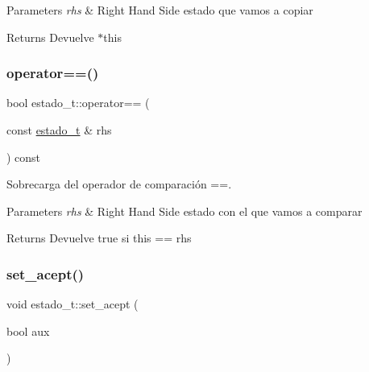 \begin{DoxyParams}{Parameters}
{\em rhs} & Right Hand Side estado que vamos a copiar \\
\hline
\end{DoxyParams}
\begin{DoxyReturn}{Returns}
Devuelve $\ast$this 
\end{DoxyReturn}
\mbox{\label{classestado__t_aa79cde64582824c8e4b313dae522b4d3}} 
\subsubsection{\texorpdfstring{operator==()}{operator==()}}
{\footnotesize\ttfamily bool estado\+\_\+t\+::operator== (\begin{DoxyParamCaption}\item[{const \hyperlink{classestado__t}{estado\+\_\+t} \&}]{rhs }\end{DoxyParamCaption}) const\hspace{0.3cm}{\ttfamily [inline]}}



Sobrecarga del operador de comparación ==. 


\begin{DoxyParams}{Parameters}
{\em rhs} & Right Hand Side estado con el que vamos a comparar \\
\hline
\end{DoxyParams}
\begin{DoxyReturn}{Returns}
Devuelve true si this == rhs 
\end{DoxyReturn}
\mbox{\label{classestado__t_afc99cf41f63ca6c25bf38ef96e330ec5}} 
\subsubsection{\texorpdfstring{set\+\_\+acept()}{set\_acept()}}
{\footnotesize\ttfamily void estado\+\_\+t\+::set\+\_\+acept (\begin{DoxyParamCaption}\item[{bool}]{aux }\end{DoxyParamCaption})\hspace{0.3cm}{\ttfamily [inline]}}



